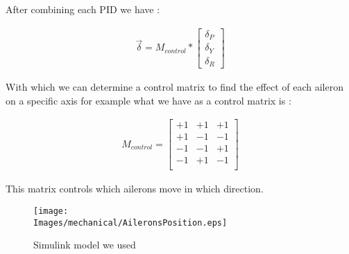 After combining each PID we have :

\begin{gather*}
    \overrightarrow{\delta} = M_{control} *
    \begin{bmatrix}
        \delta_P \\
        \delta_Y \\
        \delta_R
    \end{bmatrix}
\end{gather*}

With which we can determine a control matrix to find the effect of each aileron
on a specific axis for example what we have as a control matrix is :

\begin{gather*}
    M_{control} =
    \begin{bmatrix}
        +1 & +1 & +1 \\
        +1 & -1 & -1 \\
        -1 & -1 & +1 \\
        -1 & +1 & -1 \\
    \end{bmatrix}
\end{gather*}

This matrix controls which ailerons move in which direction.

\begin{figure}[!hbt]
    \centering
    \texttt{[image: \\Images/mechanical/AileronsPosition.eps]}
    \caption{Simulink model we used}
\end{figure}
\FloatBarrier